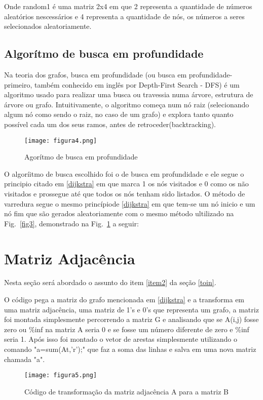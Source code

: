 Onde random1 é uma matriz 2x4 em que 2 representa a quantidade de números aleatórios nescessários e 4 representa a quantidade de nós, os números a seres selecionados aleatoriamente.

\subsection{Algorítmo de busca em profundidade} \label{busca}
Na teoria dos grafos, busca em profundidade (ou busca em profundidade-primeiro, também conhecido em inglês por Depth-First Search - DFS) é um algoritmo usado para realizar uma busca ou travessia numa árvore, estrutura de árvore ou grafo. Intuitivamente, o algoritmo começa num nó raiz (selecionando algum nó como sendo o raiz, no caso de um grafo) e explora tanto quanto possível cada um dos seus ramos, antes de retroceder(backtracking).


\begin{figure}[!h]
\centering
\texttt{[image: figura4.png]}
%
\caption{Agorítmo de busca em profundidade}
\label{fig4}
\end{figure}

O algoríitmo de busca escolhido foi o de busca em profundidade e ele segue o principio citado em \ref{dijkstra} em que marca 1 os nós visitados e 0 como os não visitados e prossegue até que todos os nós tenham sido listados. O método de varredura segue o mesmo princípiode \ref{dijkstra} em que tem-se um nó inicio e um nó fim que são gerados aleatoriamente com o mesmo método ultilizado na Fig.~\ref{fig3}, demonstrado na Fig.~\ref{fig4} a seguir:


\newpage
\section{Matriz Adjacência} \label{matrizA}
Nesta seção será abordado o assunto do item \ref{item2} da seção \ref{toin}.

O código pega a matriz do grafo mencionada em \ref{dijkstra} e a transforma em uma matriz adjacência, uma matriz de 1's e 0's que representa um grafo, a matriz foi montada simplesmente percorrendo a matriz G e analisando que se A(i,j) fosse zero ou \%inf na matriz A seria 0 e se fosse um número diferente de zero e \%inf seria 1. Após isso foi montado o vetor de arestas simplesmente utilizando o comando "a=sum(At,'r');" que faz a soma das linhas e salva em uma nova matriz  chamada "a".

\begin{figure}[!h]
\centering
\texttt{[image: figura5.png]}
%
\caption{Código de transformação da matriz adjacência A para a matriz B}
\label{fig5}
\end{figure}

